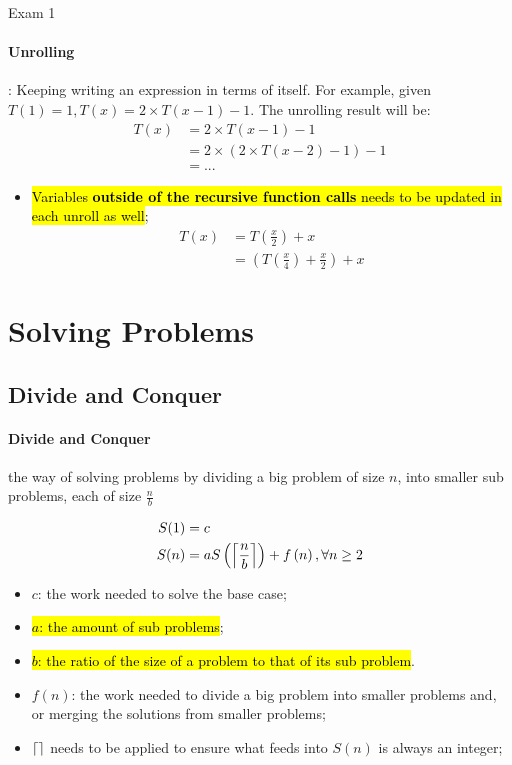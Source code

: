 \documentclass{note}
\DeclarePairedDelimiter\ceil{\lceil}{\rceil}
\begin{document}
\begin{note}{Exam 1}
    \paragraph{Unrolling}: Keeping writing an expression in terms of itself. For example, given $ T(1) = 1, T(x) = 2 \times T(x - 1) - 1 $.
    The unrolling result will be:
    \begin{align*}
        T(x) &= 2 \times T(x - 1) - 1 \\
        &= 2 \times \left( 2 \times T(x - 2) - 1 \right) - 1\\
        &= ...
    \end{align*}

    \begin{itemize}
        \item \hl{Variables \textbf{outside of the recursive function calls} needs to be updated in each unroll as well};
        \begin{align*}
            T(x) &= T \left( \frac{x}{2} \right) + x  \\
            &= \left( T \left( \frac{x}{4} \right) + \frac{x}{2} \right) + x
        \end{align*}
    \end{itemize}

\section{Solving Problems}

    \subsection{Divide and Conquer}

    \paragraph{Divide and Conquer} the way of solving problems by dividing a big problem of size $ n $, into smaller sub problems,
    each of size $ \frac{n}{b} $

    \begin{align*}
        S(1) &= c\\
        S(n) &= a S\left(\ceil*{ \frac{n}{b}} \right) + f \left(n \right), \forall n \geq 2
    \end{align*}

    \begin{itemize}
        \item $ c $: the work needed to solve the base case;
        \item \hl{$ a $: the amount of sub problems};
        \item \hl{$ b $: the ratio of the size of a problem to that of its sub problem}.
        \item $ f \left(n \right) $: the work needed to divide a big problem into smaller problems and, or merging the solutions from smaller
        problems;
        \item $ \ceil*{} $ needs to be applied to ensure what feeds into $ S (n) $ is always an integer;
    \end{itemize}


\end{note}
\end{document}
